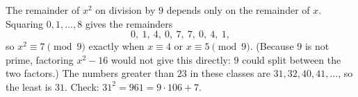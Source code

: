 The remainder of $x^2$ on division by $9$ depends only on the remainder of $x$. Squaring $0,1,\dots,8$ gives the remainders
\[0,\ 1,\ 4,\ 0,\ 7,\ 7,\ 0,\ 4,\ 1,\]
so $x^2\equiv7\pmod 9$ exactly when $x\equiv4$ or $x\equiv5\pmod9$. (Because $9$ is not prime, factoring $x^2-16$ would not give this directly: $9$ could split between the two factors.) The numbers greater than $23$ in these classes are $31,32,40,41,\dots$, so the least is $\boxed{31}$. Check: $31^2=961=9\cdot106+7$.
